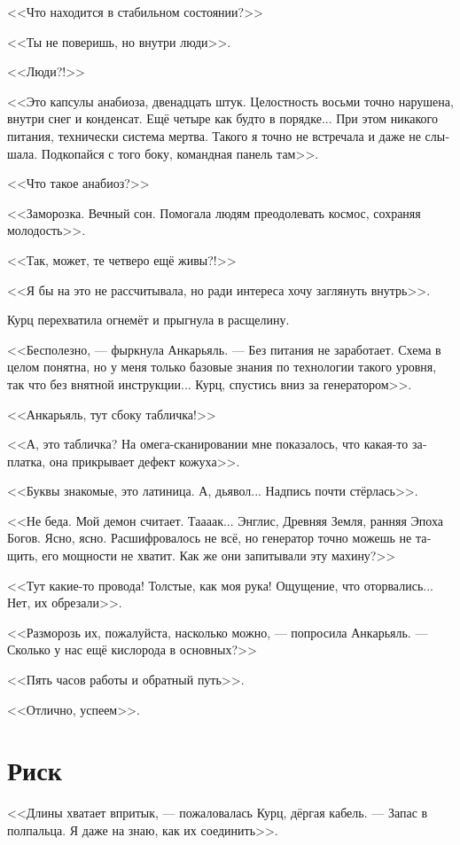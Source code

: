 \documentclass[a4paper,12pt,fleqn]{book}\usepackage{polyglossia}\setdefaultlanguage[babelshorthands=true]{russian}\setotherlanguage{english}\defaultfontfeatures{Ligatures=TeX,Mapping=tex-text}\usepackage{xcolor}\newcommand{\ml}[3]{#2}
\begin{document}
<<Что находится в стабильном состоянии?>>

<<Ты не поверишь, но внутри люди>>.

<<Люди?!>>

<<Это капсулы анабиоза, двенадцать штук.
Целостность восьми точно нарушена, внутри снег и конденсат.
Ещё четыре как будто в порядке...
При этом никакого питания, технически система мертва.
Такого я точно не встречала и даже не слышала.
Подкопайся с того боку, командная панель там>>.

<<Что такое анабиоз?>>

<<Заморозка.
Вечный сон.
Помогала людям преодолевать космос, сохраняя молодость>>.

<<Так, может, те четверо ещё живы?!>>

<<Я бы на это не рассчитывала, но ради интереса хочу заглянуть внутрь>>.

Курц перехватила огнемёт и прыгнула в расщелину.

<<Бесполезно, --- фыркнула Анкарьяль.
--- Без питания не заработает.
Схема в целом понятна, но у меня только базовые знания по технологии такого уровня, так что без внятной инструкции...
Курц, спустись вниз за генератором>>.

<<Анкарьяль, тут сбоку табличка!>>

<<А, это табличка?
На омега-сканировании мне показалось, что какая-то заплатка, она прикрывает дефект кожуха>>.

<<Буквы знакомые, это латиница.
А, дьявол...
Надпись почти стёрлась>>.

<<Не беда.
Мой демон считает.
Таааак...
Энглис, Древняя Земля, ранняя Эпоха Богов.
Ясно, ясно.
Расшифровалось не всё, но генератор точно можешь не тащить, его мощности не хватит.
Как же они запитывали эту махину?>>

<<Тут какие-то провода!
Толстые, как моя рука!
Ощущение, что оторвались...
Нет, их обрезали>>.

<<Разморозь их, пожалуйста, насколько можно, --- попросила Анкарьяль.
--- Сколько у нас ещё кислорода в основных?>>

<<Пять часов работы и обратный путь>>.

<<Отлично, успеем>>.

\section{Риск}

<<Длины хватает впритык, --- пожаловалась Курц, дёргая кабель.
--- Запас в полпальца.
Я даже на знаю, как их соединить>>.
\end{document}
